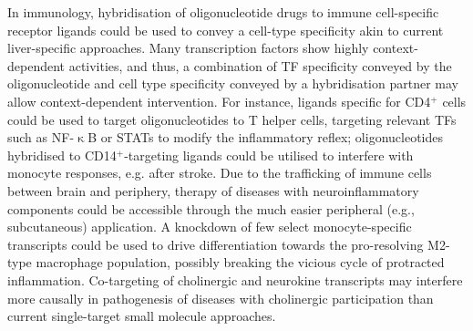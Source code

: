 In immunology, hybridisation of oligonucleotide drugs to immune cell-specific receptor ligands could be used to convey a cell-type specificity akin to current liver-specific approaches. Many transcription factors show highly context-dependent activities,\cite{Hamada2020} and thus, a combination of TF specificity conveyed by the oligonucleotide and cell type specificity conveyed by a hybridisation partner may allow context-dependent intervention. For instance, ligands specific for CD4$^+$ cells could be used to target oligonucleotides to T helper cells, targeting relevant TFs such as NF-$\upkappa$B or STATs to modify the inflammatory reflex; oligonucleotides hybridised to CD14$^+$-targeting ligands could be utilised to interfere with monocyte responses, e.g. after stroke. Due to the trafficking of immune cells between brain and periphery, therapy of diseases with neuroinflammatory components could be accessible through the much easier peripheral (e.g., subcutaneous) application. A knockdown of few select monocyte-specific transcripts could be used to drive differentiation towards the pro-resolving M2-type macrophage population,\cite{Panizzi2010} possibly breaking the vicious cycle of protracted inflammation. Co-targeting of cholinergic and neurokine transcripts may interfere more causally in pathogenesis of diseases with cholinergic participation than current single-target small molecule approaches.

